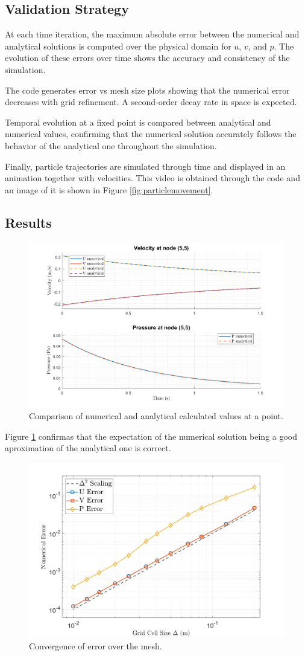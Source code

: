 \subsection{Validation Strategy}

At each time iteration, the maximum absolute error between the numerical and analytical solutions is computed over the physical domain for $u$, $v$, and $p$. The evolution of these errors over time shows the accuracy and consistency of the simulation.

The code generates error vs mesh size plots showing that the numerical error decreases with grid refinement. A second-order decay rate in space is expected.

Temporal evolution at a fixed point is compared between analytical and numerical values, confirming that the numerical solution accurately follows the behavior of the analytical one throughout the simulation.

Finally, particle trajectories are simulated through time and displayed in an animation together with velocities. This video is obtained through the code and an image of it is shown in Figure \ref{fig:particlemovement}.

\subsection{Results}

\begin{figure}[H]
    \centering
    \includegraphics[width=0.6\linewidth]{imatges/comparison.png}
    \caption{Comparison of numerical and analytical calculated values at a point.}
    \label{fig:comparison}
\end{figure}

Figure \ref{fig:comparison} confirmas that the expectation of the numerical solution being a good aproximation of the analytical one is correct.

\begin{figure}[H]
    \centering
    \includegraphics[width=0.6\linewidth]{imatges/partcerror.png}
    \caption{Convergence of error over the mesh.}
    \label{fig:errorC}
\end{figure}

